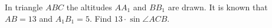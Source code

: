 In triangle $ABC$ the altitudes $AA_{1}$ and $BB_{1}$ are drawn. It is known that $AB=13$ and $A_{1}B_{1}=5$. Find $13\cdot\sin\angle ACB$.
